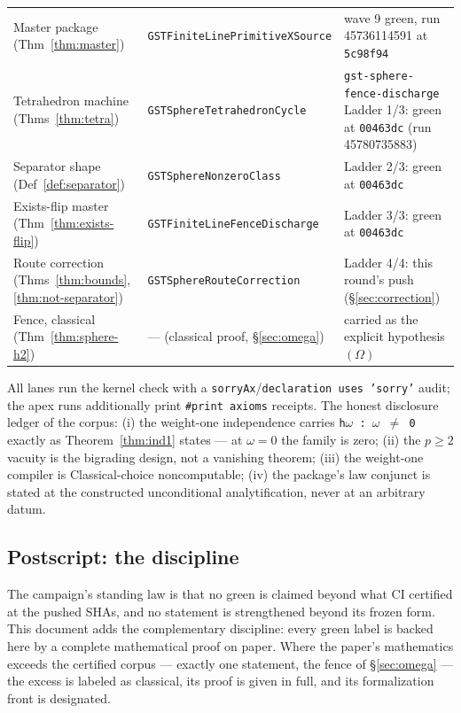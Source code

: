 \documentclass[11pt,a4paper]{article}
\theoremstyle{plain}
\theoremstyle{definition}
\begin{document}
\begin{longtable}{@{}p{}p{}p{}@{}}
Master package (Thm~\ref{thm:master}) &
\texttt{GSTFiniteLinePrimitiveXSource} & wave 9 green, run
45736114591 at \texttt{5c98f94}\\
Tetrahedron machine (Thms~\ref{thm:tetra}) &
\texttt{GSTSphereTetrahedronCycle} &
\texttt{gst-sphere-fence-discharge} Ladder 1/3: green at
\texttt{00463dc} (run 45780735883)\\
Separator shape (Def~\ref{def:separator}) &
\texttt{GSTSphereNonzeroClass} & Ladder 2/3: green at
\texttt{00463dc}\\
Exists-flip master (Thm~\ref{thm:exists-flip}) &
\texttt{GSTFiniteLineFenceDischarge} & Ladder 3/3: green at
\texttt{00463dc}\\
Route correction (Thms~\ref{thm:bounds},
\ref{thm:not-separator}) & \texttt{GSTSphereRouteCorrection} &
Ladder 4/4: this round's push (\S\ref{sec:correction})\\
Fence, classical (Thm~\ref{thm:sphere-h2}) & --- (classical
proof, \S\ref{sec:omega}) & carried as the explicit hypothesis
$(\Omega)$\\
\bottomrule
\end{longtable}

\noindent All lanes run the kernel check with a
\texttt{sorryAx}/\texttt{declaration uses 'sorry'} audit; the apex
runs additionally print \texttt{\#print axioms} receipts.  The honest
disclosure ledger of the corpus: (i) the weight-one independence
carries \texttt{h\ensuremath{\omega}~:~\ensuremath{\omega}~\ensuremath{\ne}~0} exactly as
Theorem~\ref{thm:ind1} states --- at $\omega = 0$ the family is
zero; (ii) the $p \ge 2$ vacuity is the bigrading design, not a
vanishing theorem; (iii) the weight-one compiler is Classical-choice
noncomputable; (iv) the package's law conjunct is stated at the
constructed unconditional analytification, never at an arbitrary
datum.

\subsection{Postscript: the discipline}

The campaign's standing law is that no green is claimed beyond what
CI certified at the pushed SHAs, and no statement is strengthened
beyond its frozen form.  This document adds the complementary
discipline: every green label is backed here by a complete
mathematical proof on paper.  Where the paper's mathematics exceeds
the certified corpus --- exactly one statement, the fence of
\S\ref{sec:omega} --- the excess is labeled as classical, its proof
is given in full, and its formalization front is designated.
\end{document}
